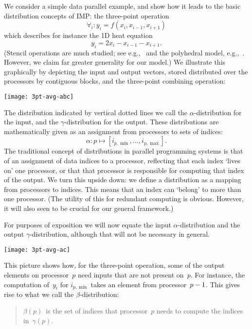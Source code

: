 
We consider a simple data parallel example, and show how it leads
to the basic distribution concepts of \ac{IMP}: the three-point operation
\[ \forall_i\colon y_i=f(x_i,x_{i-1},x_{i+1}) \]
which describes for instance the 1D heat equation
\[ y_i = 2x_i-x_{i-1}-x_{i+1}. \]
(Stencil operations are much studied; see e.g.,~\cite{Tang:2011:pochoir}
and the polyhedral model, e.g.,~\cite{Dathathri:generating-movement}.
However, we claim far greater generality for our model.)
We  illustrate this graphically by depicting the input and output vectors,
stored distributed over the processors by contiguous blocks,
and the three-point combining operation:

\texttt{[image: 3pt-avg-abc]}

The distribution indicated by vertical dotted lines
we call the $\alpha$-distribution for the input,
and the $\gamma$-distribution for the output.
These distributions are mathematically given as
an assignment from processors to sets of indices:
\[ \alpha\colon p\mapsto [ i_{p,\min},\ldots,i_{p,\max}]. \]
The traditional concept of distributions in parallel programming systems
is that of an assignment of data indices to a processor,
reflecting that each index `lives on' one processor,
or that that processor is responsible for computing that index of the output.
We turn this upside down: we define a distribution as a mapping from 
processors to indices. This means that an index can `belong' to more than
one processor. (The utility of this for redundant computing is
obvious. However, it will also seen to be crucial for our general framework.)

For purposes of exposition we will now equate
the input $\alpha$-distribution and the output $\gamma$-distribution,
although that will
not be necessary in general.

\texttt{[image: 3pt-avg-ac]}

This 
picture shows how, for the three-point operation,
some of the output elements on processor~$p$
need inputs that are not present on~$p$.
For instance, the computation of~$y_i$
for $i_{p,\min}$ takes an element from processor~$p-\nobreak1$.
This gives rise to what we call the $\beta$-distribution:
\begin{quotation}
\begin{mdframed}{$\beta(p)$~is the set
of indices that processor~$p$ needs to compute the indices in~$\gamma(p)$.}
\end{mdframed}
\end{quotation}

